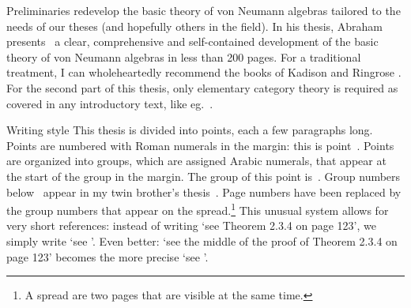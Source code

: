 \begin{parsec}
\begin{point}{Preliminaries}
     redevelop the basic theory of von Neumann algebras
     tailored to the needs of our theses (and hopefully others
     in the field).
In his thesis, Abraham presents~\cite{bram}
    a clear, comprehensive and self-contained development of the basic
    theory of von Neumann algebras in less than 200 pages.
For a traditional treatment,
    I can wholeheartedly recommend the books of Kadison and Ringrose \cite{kr}.
For the second part of this thesis,
    only elementary category theory is required
    as covered in any introductory text, like eg.~\cite{awodey}.
\end{point}
\begin{point}{Writing style}%
This thesis is divided into points,
    each a few paragraphs long.
Points are numbered with Roman numerals in the margin:
    this is point~.
Points  are organized into groups,
    which are assigned Arabic numerals,
    that appear at the start of the group in the margin.
The group of this point is~.
Group numbers below~
    appear in my twin brother's thesis~\cite{bram}.
Page numbers have been replaced by the
    group numbers that appear on the spread.\footnote{%
        A spread are two pages that are visible at the same time.}
This unusual system allows for
    very short references:
    instead of writing `see Theorem 2.3.4 on page 123',
    we simply write `see '.
Even better: `see the middle of the proof of Theorem 2.3.4 on page 123'
    becomes the more precise `see '.


\end{point}
\end{parsec}

